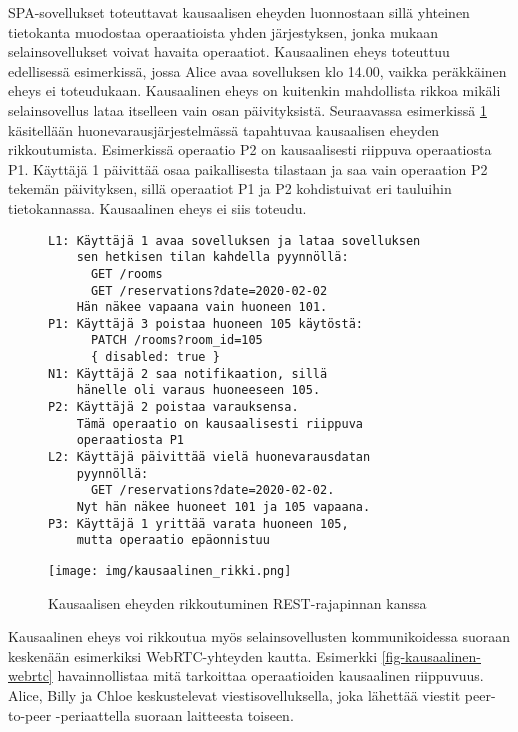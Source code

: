 \documentclass[finnish,twoside,censored,csm,sw-track-2018]{HYthesisML}
\begin{document}
SPA-sovellukset toteuttavat kausaalisen eheyden luonnostaan sillä yhteinen tietokanta muodostaa operaatioista yhden järjestyksen, jonka mukaan selainsovellukset voivat havaita operaatiot.  Kausaalinen eheys toteuttuu edellisessä esimerkissä, jossa Alice avaa sovelluksen klo 14.00, vaikka peräkkäinen eheys ei toteudukaan. Kausaalinen eheys on kuitenkin mahdollista rikkoa mikäli selainsovellus lataa itselleen vain osan päivityksistä. Seuraavassa esimerkissä \ref{fig-kausaalinen-rest} käsitellään huonevarausjärjestelmässä tapahtuvaa kausaalisen eheyden rikkoutumista. Esimerkissä operaatio P2 on kausaalisesti riippuva operaatiosta P1. Käyttäjä 1 päivittää osaa paikallisesta tilastaan ja saa vain operaation P2 tekemän päivityksen, sillä operaatiot P1 ja P2 kohdistuivat eri tauluihin tietokannassa. Kausaalinen eheys ei siis toteudu.

\vspace{3mm}
\begin{figure}[ht]
\begin{minipage}{.45\textwidth}
  \begin{Verbatim}[fontsize=\scriptsize]
L1: Käyttäjä 1 avaa sovelluksen ja lataa sovelluksen
    sen hetkisen tilan kahdella pyynnöllä:
      GET /rooms
      GET /reservations?date=2020-02-02
    Hän näkee vapaana vain huoneen 101.
P1: Käyttäjä 3 poistaa huoneen 105 käytöstä:
      PATCH /rooms?room_id=105
      { disabled: true }
N1: Käyttäjä 2 saa notifikaation, sillä
    hänelle oli varaus huoneeseen 105.
P2: Käyttäjä 2 poistaa varauksensa.
    Tämä operaatio on kausaalisesti riippuva
    operaatiosta P1
L2: Käyttäjä päivittää vielä huonevarausdatan
    pyynnöllä:
      GET /reservations?date=2020-02-02.
    Nyt hän näkee huoneet 101 ja 105 vapaana.
P3: Käyttäjä 1 yrittää varata huoneen 105,
    mutta operaatio epäonnistuu
\end{Verbatim}
\end{minipage}%
\begin{minipage}{.55\textwidth}
  \begin{center}
    \texttt{[image: img/kausaalinen\_rikki.png]}
  \end{center}
\end{minipage}%
\caption{Kausaalisen eheyden rikkoutuminen REST-rajapinnan kanssa}
\label{fig-kausaalinen-rest}
\end{figure}

Kausaalinen eheys voi rikkoutua myös selainsovellusten kommunikoidessa suoraan keskenään esimerkiksi WebRTC-yhteyden kautta. Esimerkki \ref{fig-kausaalinen-webrtc} havainnollistaa mitä tarkoittaa operaatioiden kausaalinen riippuvuus. Alice, Billy ja Chloe keskustelevat viestisovelluksella, joka lähettää viestit peer-to-peer -periaattella suoraan laitteesta toiseen.
\end{document}
